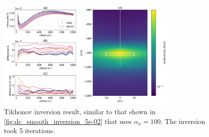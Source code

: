 \begin{figure}
    \begin{center}
    \includegraphics[width=0.8\textwidth]{figures/inversion/dc_smooth_inversion_5e-02_alpha_100.png}
    \end{center}
\caption{
    Tikhonov inversion result, similar to that shown in \ref{fig:dc_smooth_inversion_5e-02}
    that uses $\alpha_x = 100$. The inversion took 5 iterations.
}
\label{fig:dc_smooth_inversion_5e-02_alpha_100}
\end{figure}
